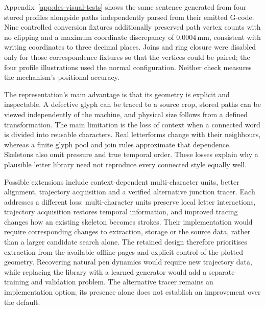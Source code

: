 Appendix~\ref{app:des-visual-tests} shows the same sentence generated from four stored profiles alongside paths independently parsed from their emitted G-code. Nine controlled conversion fixtures additionally preserved path vertex counts with no clipping and a maximum coordinate discrepancy of $0.0004$\,mm, consistent with writing coordinates to three decimal places. Joins and ring closure were disabled only for those correspondence fixtures so that the vertices could be paired; the four profile illustrations used the normal configuration. Neither check measures the mechanism's positional accuracy.

The representation's main advantage is that its geometry is explicit and inspectable. A defective glyph can be traced to a source crop, stored paths can be viewed independently of the machine, and physical size follows from a defined transformation. The main limitation is the loss of context when a connected word is divided into reusable characters. Real letterforms change with their neighbours, whereas a finite glyph pool and join rules approximate that dependence. Skeletons also omit pressure and true temporal order. These losses explain why a plausible letter library need not reproduce every connected style equally well.

Possible extensions include context-dependent multi-character units, better alignment, trajectory acquisition and a verified alternative junction tracer. Each addresses a different loss: multi-character units preserve local letter interactions, trajectory acquisition restores temporal information, and improved tracing changes how an existing skeleton becomes strokes. Their implementation would require corresponding changes to extraction, storage or the source data, rather than a larger candidate search alone.
The retained design therefore prioritises extraction from the available offline pages and explicit control of the plotted geometry. Recovering natural pen dynamics would require new trajectory data, while replacing the library with a learned generator would add a separate training and validation problem. The alternative tracer remains an implementation option; its presence alone does not establish an improvement over the default.
\FloatBarrier
